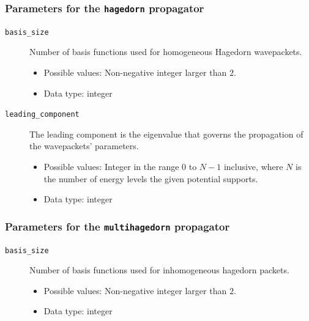\documentclass[a4paper,10pt]{report}
\begin{document}
\subsubsection{Parameters for the \texttt{hagedorn} propagator}

\begin{description}
  \item[\texttt{basis\_size}] Number of basis functions used for homogeneous Hagedorn wavepackets.
  \begin{itemize}
    \item Possible values: Non-negative integer larger than $2$.
    \item Data type: integer
  \end{itemize}

  \item[\texttt{leading\_component}] The leading component is the eigenvalue that
    governs the propagation of the wavepackets' parameters.
  \begin{itemize}
    \item Possible values: Integer in the range $0$ to $N-1$ inclusive, where $N$
      is the number of energy levels the given potential supports.
    \item Data type: integer
  \end{itemize}
\end{description}

\subsubsection{Parameters for the \texttt{multihagedorn} propagator}

\begin{description}
  \item[\texttt{basis\_size}] Number of basis functions used for inhomogeneous hagedorn packets.
  \begin{itemize}
    \item Possible values: Non-negative integer larger than $2$.
    \item Data type: integer
  \end{itemize}
\end{description}

%
%
\end{document}
